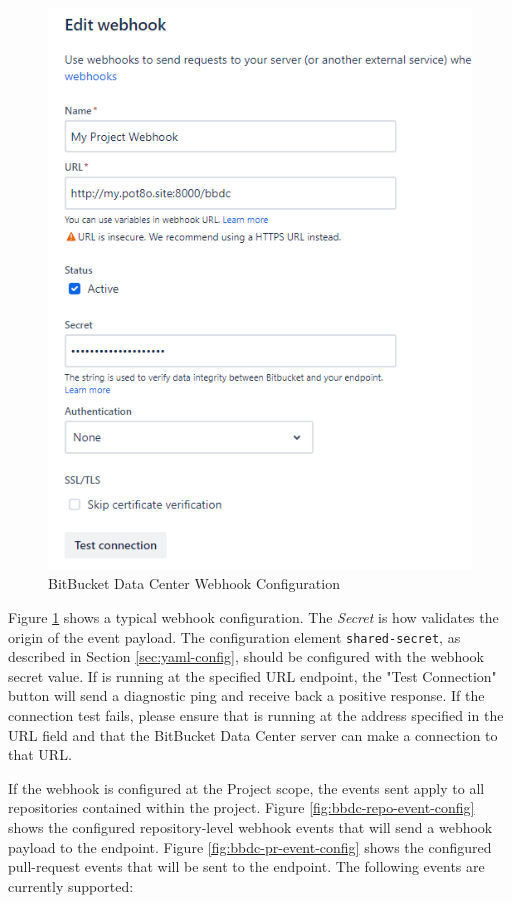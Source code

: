 \begin{figure}[ht]
    \includegraphics[width=\textwidth]{graphics/bbdc-webhook-config.png}
    \caption{BitBucket Data Center Webhook Configuration}
    \label{fig:bbdc-webhook-config}
\end{figure}


Figure \ref{fig:bbdc-webhook-config} shows a typical webhook configuration.  The \textit{Secret} is how \cxoneflow
validates the origin of the event payload.  The configuration element \texttt{shared-secret}, as described
in Section \ref{sec:yaml-config}, should be configured with the webhook secret value.  If \cxoneflow
is running at the specified URL endpoint, the "Test Connection" button will send a diagnostic ping
and receive back a positive response.  If the connection test fails, please ensure that \cxoneflow is running
at the address specified in the URL field and that the BitBucket Data Center server can make a connection
to that URL.

If the webhook is configured at the Project scope, the events sent apply to all repositories contained
within the project.  Figure \ref{fig:bbdc-repo-event-config} shows the configured repository-level webhook 
events that will send a webhook payload to the \cxoneflow endpoint. 
Figure \ref{fig:bbdc-pr-event-config} shows the configured pull-request events that will be sent to 
the \cxoneflow endpoint.  The following events are currently supported:

